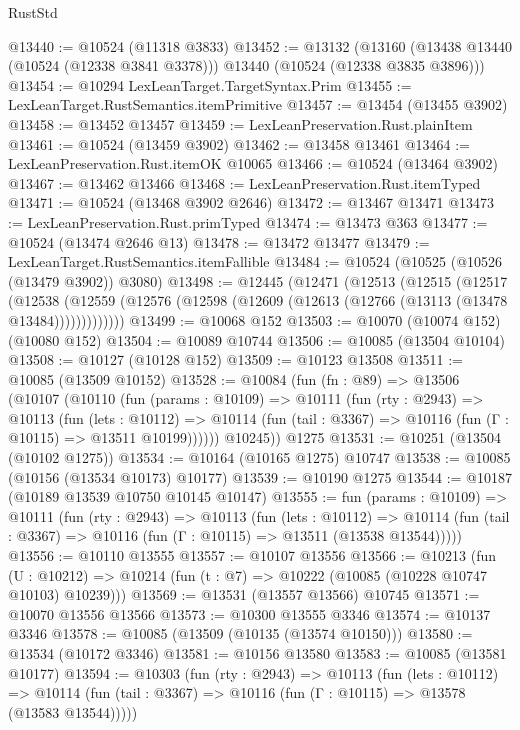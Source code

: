 \begin{lexlean}{RustStd}
\begin{coremodule}
@13440 := @10524 (@11318 @3833)
@13452 := @13132
    (@13160 (@13438 @13440 (@10524 (@12338 @3841 @3378))) @13440 (@10524 (@12338 @3835 @3896)))
@13454 := @10294 LexLeanTarget.TargetSyntax.Prim
@13455 := LexLeanTarget.RustSemantics.itemPrimitive
@13457 := @13454 (@13455 @3902)
@13458 := @13452 @13457
@13459 := LexLeanPreservation.Rust.plainItem
@13461 := @10524 (@13459 @3902)
@13462 := @13458 @13461
@13464 := LexLeanPreservation.Rust.itemOK @10065
@13466 := @10524 (@13464 @3902)
@13467 := @13462 @13466
@13468 := LexLeanPreservation.Rust.itemTyped
@13471 := @10524 (@13468 @3902 @2646)
@13472 := @13467 @13471
@13473 := LexLeanPreservation.Rust.primTyped
@13474 := @13473 @363
@13477 := @10524 (@13474 @2646 @13)
@13478 := @13472 @13477
@13479 := LexLeanTarget.RustSemantics.itemFallible
@13484 := @10524 (@10525 (@10526 (@13479 @3902)) @3080)
@13498 := @12445
    (@12471
      (@12513
        (@12515
          (@12517
            (@12538
              (@12559 (@12576 (@12598 (@12609 (@12613 (@12766 (@13113 (@13478 @13484)))))))))))))
@13499 := @10068 @152
@13503 := @10070 (@10074 @152) (@10080 @152)
@13504 := @10089 @10744
@13506 := @10085 (@13504 @10104)
@13508 := @10127 (@10128 @152)
@13509 := @10123 @13508
@13511 := @10085 (@13509 @10152)
@13528 := @10084
    (fun (fn : @89) =>
    @13506
      (@10107
        (@10110
          (fun (params : @10109) =>
          @10111
            (fun (rty : @2943) =>
            @10113
              (fun (lets : @10112) =>
              @10114 (fun (tail : @3367) => @10116 (fun (Γ : @10115) => @13511 @10199))))))
        @10245))
    @1275
@13531 := @10251 (@13504 (@10102 @1275))
@13534 := @10164 (@10165 @1275) @10747
@13538 := @10085 (@10156 (@13534 @10173) @10177)
@13539 := @10190 @1275
@13544 := @10187 (@10189 @13539 @10750 @10145 @10147)
@13555 := fun (params : @10109) =>
  @10111
    (fun (rty : @2943) =>
    @10113
      (fun (lets : @10112) =>
      @10114 (fun (tail : @3367) => @10116 (fun (Γ : @10115) => @13511 (@13538 @13544)))))
@13556 := @10110 @13555
@13557 := @10107 @13556
@13566 := @10213
    (fun (U : @10212) => @10214 (fun (t : @7) => @10222 (@10085 (@10228 @10747 @10103) @10239)))
@13569 := @13531 (@13557 @13566) @10745
@13571 := @10070 @13556 @13566
@13573 := @10300 @13555 @3346
@13574 := @10137 @3346
@13578 := @10085 (@13509 (@10135 (@13574 @10150)))
@13580 := @13534 (@10172 @3346)
@13581 := @10156 @13580
@13583 := @10085 (@13581 @10177)
@13594 := @10303
    (fun (rty : @2943) =>
    @10113
      (fun (lets : @10112) =>
      @10114 (fun (tail : @3367) => @10116 (fun (Γ : @10115) => @13578 (@13583 @13544)))))

\end{coremodule}
\end{lexlean}
